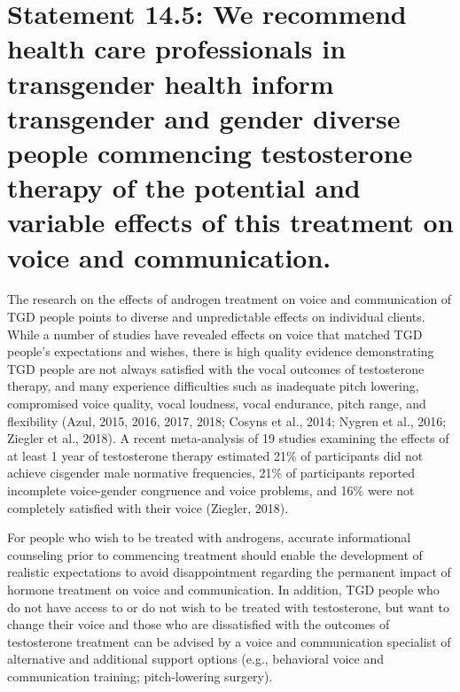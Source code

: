 \documentclass[
]{book}
\begin{document}
\hypertarget{statement-14.5-we-recommend-health-care-professionals-in-transgender-health-inform-transgender-and-gender-diverse-people-commencing-testosterone-therapy-of-the-potential-and-variable-effects-of-this-treatment-on-voice-and-communication.}{%
\section*{Statement 14.5: We recommend health care professionals in transgender health inform transgender and gender diverse people commencing testosterone therapy of the potential and variable effects of this treatment on voice and communication.}\label{statement-14.5-we-recommend-health-care-professionals-in-transgender-health-inform-transgender-and-gender-diverse-people-commencing-testosterone-therapy-of-the-potential-and-variable-effects-of-this-treatment-on-voice-and-communication.}}

The research on the effects of androgen treatment on voice and communication of TGD people points to diverse and unpredictable effects
on individual clients. While a number of studies
have revealed effects on voice that matched TGD
people's expectations and wishes, there is high
quality evidence demonstrating TGD people are
not always satisfied with the vocal outcomes of
testosterone therapy, and many experience difficulties such as inadequate pitch lowering, compromised voice quality, vocal loudness, vocal
endurance, pitch range, and flexibility (Azul,
2015, 2016, 2017, 2018; Cosyns et al., 2014;
Nygren et al., 2016; Ziegler et al., 2018). A
recent meta-analysis of 19 studies examining the
effects of at least 1 year of testosterone therapy
estimated 21\% of participants did not achieve
cisgender male normative frequencies, 21\% of
participants reported incomplete voice-gender
congruence and voice problems, and 16\% were
not completely satisfied with their voice
(Ziegler, 2018).

For people who wish to be treated with androgens, accurate informational counseling prior to
commencing treatment should enable the development of realistic expectations to avoid disappointment regarding the permanent impact of
hormone treatment on voice and communication. In addition, TGD people who do not have
access to or do not wish to be treated with testosterone, but want to change their voice and
those who are dissatisfied with the outcomes of
testosterone treatment can be advised by a voice
and communication specialist of alternative and
additional support options (e.g., behavioral voice
and communication training; pitch-lowering
surgery).
\end{document}
